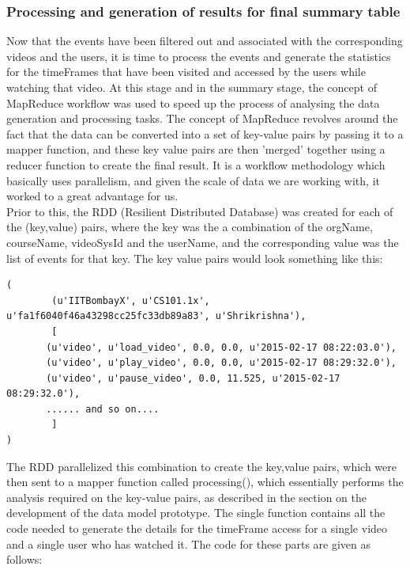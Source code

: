 \documentclass[16pt]{report}
\begin{document}
\subsubsection{Processing and generation of results for final summary table}


Now that the events have been filtered out and associated with the corresponding videos and the users, it is time to process the events and generate the statistics for the timeFrames that have been visited and accessed by the users while watching that video.
At this stage and in the summary stage, the concept of MapReduce workflow was used to speed up the process of analysing the data generation and processing tasks. The concept of MapReduce revolves around the fact that the data can be converted into a set of key-value pairs by passing it to a mapper function, and these key value pairs are then 'merged' together using a reducer function to create the final result. It is a workflow methodology which basically uses parallelism, and given the scale of data we are working with, it worked to a great advantage for us.\\

Prior to this, the RDD (Resilient Distributed Database) was created for each of the (key,value) pairs, where the key was the a combination of the orgName, courseName, videoSysId and the userName, and the corresponding value was the list of events for that key. The key value pairs would look something like this:

\begin{verbatim}
(
    	(u'IITBombayX', u'CS101.1x', u'fa1f6040f46a43298cc25fc33db89a83', u'Shrikrishna'),
    	[
       (u'video', u'load_video', 0.0, 0.0, u'2015-02-17 08:22:03.0'),
       (u'video', u'play_video', 0.0, 0.0, u'2015-02-17 08:29:32.0'), 
       (u'video', u'pause_video', 0.0, 11.525, u'2015-02-17 08:29:32.0'), 
  	   ...... and so on....
    	]
)
\end{verbatim}

The RDD parallelized this combination to create the key,value pairs, which were then sent to a mapper function called processing(), which essentially performs the analysis required on the key-value pairs, as described in the section on the development of the data model prototype. The single function contains all the code needed to generate the details for the timeFrame access for a single video and a single user who has watched it. The code for these parts are given as follows:
\end{document}

